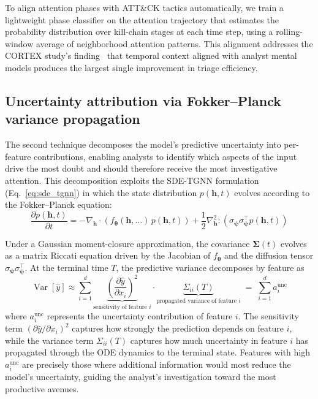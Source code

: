 \documentclass[preprint,review,12pt]{elsarticle}
\newcommand{\vh}{\mathbf{h}}            %
\newcommand{\vy}{\hat{y}}               %
\newcommand{\vSigma}{\boldsymbol{\Sigma}} %
\newcommand{\vtheta}{\boldsymbol{\theta}} %
\newcommand{\vpsi}{\boldsymbol{\psi}}     %
\DeclareMathOperator{\Var}{Var}
\begin{document}
To align attention phases with ATT\&CK tactics automatically, we train a lightweight phase classifier on the attention trajectory that estimates the probability distribution over kill-chain stages at each time step, using a rolling-window average of neighborhood attention patterns. This alignment addresses the CORTEX study's finding~\cite{cortex2025} that temporal context aligned with analyst mental models produces the largest single improvement in triage efficiency.

\subsection{Uncertainty attribution via Fokker--Planck variance propagation}
\label{subsec:uncertainty_attr}

The second technique decomposes the model's predictive uncertainty into per-feature contributions, enabling analysts to identify which aspects of the input drive the most doubt and should therefore receive the most investigative attention. This decomposition exploits the SDE-TGNN formulation (Eq.~\ref{eq:sde_tgnn}) in which the state distribution $p(\vh, t)$ evolves according to the Fokker--Planck equation:
\begin{equation}\label{eq:fokker_planck}
    \frac{\partial p(\vh, t)}{\partial t} = -\nabla_{\vh} \cdot \!\left(f_{\vtheta}(\vh, \ldots)\, p(\vh, t)\right) + \frac{1}{2} \nabla_{\vh}^2 : \!\left(\sigma_{\vpsi} \sigma_{\vpsi}^\top p(\vh, t)\right)
\end{equation}

Under a Gaussian moment-closure approximation, the covariance $\vSigma(t)$ evolves as a matrix Riccati equation driven by the Jacobian of $f_{\vtheta}$ and the diffusion tensor $\sigma_{\vpsi} \sigma_{\vpsi}^\top$. At the terminal time $T$, the predictive variance decomposes by feature as
\begin{equation}\label{eq:var_decomp}
    \Var[\vy] \approx \sum_{i=1}^{d} \underbrace{\left(\frac{\partial \vy}{\partial x_i}\right)^{\!2}}_{\text{sensitivity of feature } i} \cdot \underbrace{\Sigma_{ii}(T)}_{\text{propagated variance of feature } i} \;=\; \sum_{i=1}^{d} a_i^{\mathrm{unc}}
\end{equation}
where $a_i^{\mathrm{unc}}$ represents the uncertainty contribution of feature $i$. The sensitivity term $(\partial \vy / \partial x_i)^2$ captures how strongly the prediction depends on feature $i$, while the variance term $\Sigma_{ii}(T)$ captures how much uncertainty in feature $i$ has propagated through the ODE dynamics to the terminal state. Features with high $a_i^{\mathrm{unc}}$ are precisely those where additional information would most reduce the model's uncertainty, guiding the analyst's investigation toward the most productive avenues.
\end{document}
